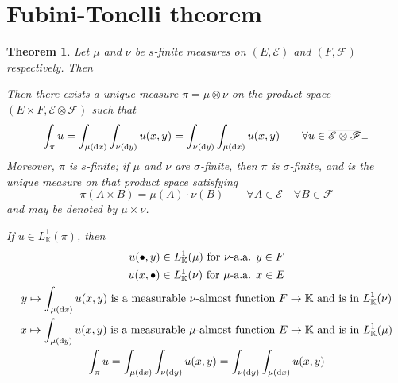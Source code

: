 \documentclass[11pt, a4paper, openany]{book}
\newtheorem{thm}{Theorem}\newtheorem{lem}{Lemma}\newtheorem{crl}{Corollary}
\theoremstyle{definition}
\begin{document}
\section{Fubini-Tonelli theorem}
    \begin{thm}\label{Fubini-Tonelli}
        Let $\mu$ and $\nu$ be $s$-finite measures on $(E,\mathscr{E})$ and $(F,\mathscr{F})$ respectively. Then

        Then there exists a unique measure $\pi=\mu\otimes \nu$ on the product space $(E\times F,\mathscr{E}\otimes \mathscr{F})$ such that 
        \begin{equation}\label{Fubini's measure formula}
            \int_\pi u=\int_{\mu(\odif x)}\int_{\nu(\odif y)} u(x,y)=\int_{\nu(\odif y)}\int_{\mu(\odif x)} u(x,y)\qquad \forall u\in \overline{\mathscr{E}\otimes\mathscr{F}}_+
        \end{equation}
        Moreover, $\pi$ is $s$-finite; if $\mu$ and $\nu$ are $\sigma$-finite, then $\pi$ is $\sigma$-finite, and is the unique measure on that product space satisfying
        \begin{equation}\label{rectangular measure}
            \pi(A\times B)=\mu(A)\cdot \nu(B)\qquad \forall A\in\mathscr{E}\quad\forall B\in\mathscr{F}
        \end{equation}
        and may be denoted by $\mu\times \nu$.

        If $u\in L^1_\mathbb{K}(\pi)$, then
            \begin{gather*}
                u(\bullet,y)\in L^1_\mathbb{K}(\mu)\text{ for $\nu$-a.a. }y\in F\\
                u(x,\bullet)\in L^1_\mathbb{K}(\nu)\text{ for $\mu$-a.a. }x\in E\\
                y\mapsto \int_{\mu(\odif x)} u(x,y)\text{ is a measurable $\nu$-almost function }F\rightarrow \mathbb{K}\text{ and is in }L^1_\mathbb{K}(\nu)\\
                x\mapsto \int_{\mu(\odif y)} u(x,y)\text{ is a measurable $\mu$-almost function }E\rightarrow \mathbb{K}\text{ and is in }L^1_\mathbb{K}(\mu)\\
                \int_\pi u=\int_{\mu(\odif x)}\int_{\nu(\odif y)} u(x,y)=\int_{\nu(\odif y)}\int_{\mu(\odif x)} u(x,y)
            \end{gather*}
    \end{thm}
\end{document}
